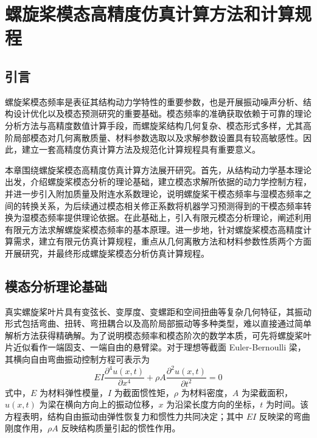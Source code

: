 \chapter{螺旋桨模态高精度仿真计算方法和计算规程}

\section{引言}

螺旋桨模态频率是表征其结构动力学特性的重要参数，也是开展振动噪声分析、结构设计优化以及模态预测研究的重要基础。模态频率的准确获取依赖于可靠的理论分析方法与高精度数值计算手段，而螺旋桨结构几何复杂、模态形式多样，尤其高阶局部模态对几何离散质量、材料参数选取以及求解参数设置具有较高敏感性。因此，建立一套高精度仿真计算方法及规范化计算规程具有重要意义。

本章围绕螺旋桨模态高精度仿真计算方法展开研究。首先，从结构动力学基本理论出发，介绍螺旋桨模态分析的理论基础，建立模态求解所依据的动力学控制方程，并进一步引入附加质量及附连水系数理论，说明螺旋桨干模态频率与湿模态频率之间的转换关系，为后续通过模态相关修正系数将机器学习预测得到的干模态频率转换为湿模态频率提供理论依据。在此基础上，引入有限元模态分析理论，阐述利用有限元方法求解螺旋桨模态频率的基本原理。进一步地，针对螺旋桨模态高精度计算需求，建立有限元仿真计算规程，重点从几何离散方法和材料参数性质两个方面开展研究，并最终形成螺旋桨模态分析仿真计算规程。

\section{模态分析理论基础}

真实螺旋桨叶片具有变弦长、变厚度、变螺距和空间扭曲等复杂几何特征，其振动形式包括弯曲、扭转、弯扭耦合以及高阶局部振动等多种类型，难以直接通过简单解析方法获得精确解。为了说明模态频率和模态阶次的数学本质，可先将螺旋桨叶片近似看作一端固支、一端自由的悬臂梁\cite{chap2:6}。对于理想等截面 Euler-Bernoulli 梁，其横向自由弯曲振动控制方程可表示为
\begin{equation}
  EI\frac{\partial^4 u(x,t)}{\partial x^4}+\rho A\frac{\partial^2 u(x,t)}{\partial t^2}=0
\end{equation}
式中，$E$ 为材料弹性模量，$I$ 为截面惯性矩，$\rho$ 为材料密度，$A$ 为梁截面积，$u(x,t)$ 为梁在横向方向上的振动位移，$x$ 为沿梁长度方向的坐标，$t$ 为时间。该方程表明，结构自由振动由弹性恢复力和惯性力共同决定；其中 $EI$ 反映梁的弯曲刚度作用，$\rho A$ 反映结构质量引起的惯性作用。

